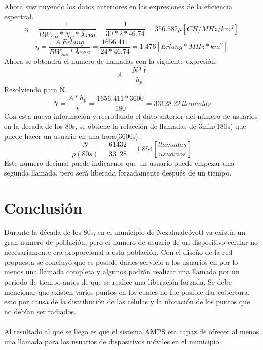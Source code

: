 \documentclass[11pt,letterpaper]{article}
\begin{document}
Ahora sustituyendo los datos anteriores en las expresiones de la eficiencia espectral. 
\begin{equation}
    \eta=\frac{1}{BW_{CH}*N_C*Área}=\frac{1}{30*2*46.74}=356.582\mu[CH/MHz/km^2]
\end{equation}
\begin{equation}
    \eta=\frac{A \ Erlang}{BW_{Sis}*Área}=\frac{1656.411}{24*46.74}=1.476 [Erlang*MHz*km^2]
\end{equation}
Ahora se obtendrá el numero de llamadas con la siguiente expresión.
\begin{equation}
    A=\frac{N*\overline{t}}{h_p}
\end{equation}
Resolviendo para N.
\begin{equation}
    N=\frac{A*h_p}{\overline{t}}=\frac{1656.411*3600}{180}=33128.22 \ llamadas
\end{equation}
Con esta nueva información y recrodando el dato anterior del número de usuarios en la decada 
de los 80s, se obtiene la relacción de llamadas de 3min(180s) que puede hacer un usuario en 
una hora(3600s).
\begin{equation}
    \frac{N}{p(80s)}=\frac{61432}{33128}=1.854[\frac{llamadas}{usuarios}]
\end{equation}
Este número decimal puede indicarnos que un usuario puede empezar una segunda llamada, pero será 
liberada forzadamente después de un tiempo.

\section{Conclusión}
Durante la década de los 80s, en el municipio de Nezahualcóyotl ya existía un gran 
numero de población, pero el numero de usuario de un dispositivo celular no 
necesariamente era proporcional a esta población. Con el diseño de la red 
propuesta se concluyó que es posible darles servicio a los usuarios en por lo 
menos una llamada completa y algunos podrán realizar una llamada por un periodo 
de tiempo antes de que se realice una liberación forzada. Se debe mencionar que 
existen varios puntos en los cuales no fue posible dar cobertura, esto por causa 
de la distribución de las células y la ubicación de los puntos que no debían ser 
radiados. 
\\ \\
Al resultado al que se llego es que el sistema AMPS era capaz de ofrecer al menos 
una llamada para los usuarios de dispositivos móviles en el municipio.


\newpage
\end{document}

